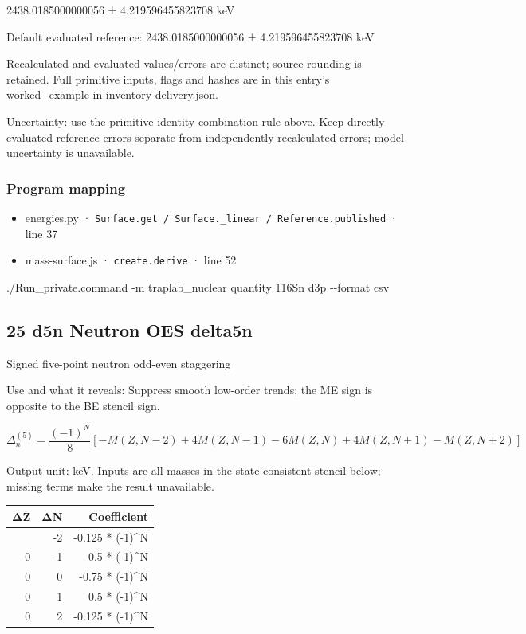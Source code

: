 \documentclass[
  11pt,
  letterpaper,
]{article}
\newenvironment{Shaded}{}{}
\newcommand{\AttributeTok}[1]{\textcolor[rgb]{0.49,0.56,0.16}{#1}}
\newcommand{\ExtensionTok}[1]{#1}
\newcommand{\NormalTok}[1]{#1}
\providecommand{\tightlist}{%
  \setlength{\itemsep}{0pt}\setlength{\parskip}{0pt}}
\begin{document}
2438.0185000000056 ± 4.219596455823708 keV

Default evaluated reference: 2438.0185000000056 ± 4.219596455823708 keV

Recalculated and evaluated values/errors are distinct; source rounding
is retained. Full primitive inputs, flags and hashes are in this entry's
worked\_example in inventory-delivery.json.

Uncertainty: use the primitive-identity combination rule above. Keep
directly evaluated reference errors separate from independently
recalculated errors; model uncertainty is unavailable.

\subsubsection{Program mapping}\label{program-mapping-23}

\begin{itemize}
\tightlist
\item
  energies.py ·
  \texttt{Surface.get\ /\ Surface.\_linear\ /\ Reference.published} ·
  line 37
\item
  mass-surface.js · \texttt{create.derive} · line 52
\end{itemize}

\begin{Shaded}
\begin{Highlighting}[]
\ExtensionTok{./Run\_private.command} \AttributeTok{{-}m}\NormalTok{ traplab\_nuclear quantity 116Sn d3p }\AttributeTok{{-}{-}format}\NormalTok{ csv}
\end{Highlighting}
\end{Shaded}

\subsection{25 d5n Neutron OES delta5n}\label{d5n-neutron-oes-delta5n}

Signed five-point neutron odd-even staggering

Use and what it reveals: Suppress smooth low-order trends; the ME sign
is opposite to the BE stencil sign.

\[
\Delta_n^{(5)}=\frac{(-1)^N}{8}[-M(Z,N-2)+4M(Z,N-1)-6M(Z,N)+4M(Z,N+1)-M(Z,N+2)]
\]

Output unit: keV. Inputs are all masses in the state-consistent stencil
below; missing terms make the result unavailable.

\begin{longtable}[]{@{}rrr@{}}
\toprule\noalign{}
ΔZ & ΔN & Coefficient \\
\midrule\noalign{}
\endhead
\bottomrule\noalign{}
\endlastfoot
0 & -2 & -0.125 * (-1)\^{}N \\
0 & -1 & 0.5 * (-1)\^{}N \\
0 & 0 & -0.75 * (-1)\^{}N \\
0 & 1 & 0.5 * (-1)\^{}N \\
0 & 2 & -0.125 * (-1)\^{}N \\
\end{longtable}
\end{document}
